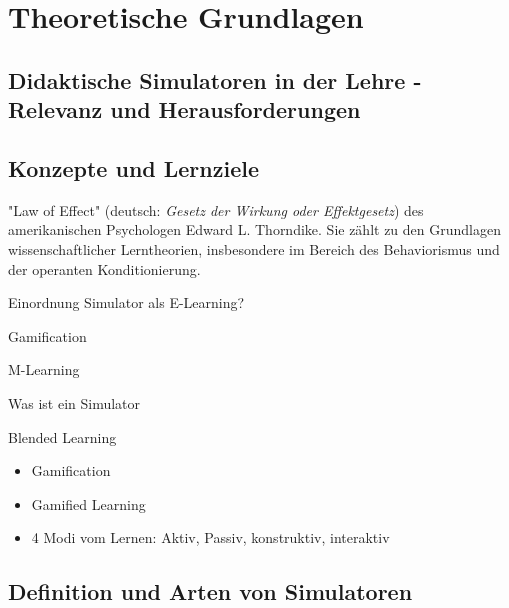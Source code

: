 \chapter{Theoretische Grundlagen}

\section{Didaktische Simulatoren in der Lehre - Relevanz und Herausforderungen}

\section{Konzepte und Lernziele}


"Law of Effect" (deutsch: \textit{Gesetz der Wirkung oder Effektgesetz}) des amerikanischen Psychologen Edward L. Thorndike. Sie zählt zu den Grundlagen wissenschaftlicher Lerntheorien, insbesondere im Bereich des Behaviorismus und der operanten Konditionierung.

Einordnung Simulator als E-Learning?

Gamification

M-Learning

Was ist ein Simulator

Blended Learning

\begin{itemize}
    \item Gamification
    \item Gamified Learning
    \item 4 Modi vom Lernen: Aktiv, Passiv, konstruktiv, interaktiv
\end{itemize}

\section{Definition und Arten von Simulatoren}
